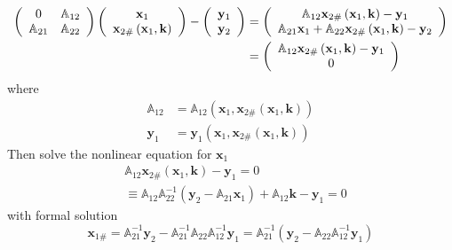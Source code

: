 \documentclass[aps,preprint]{revtex4}%
\begin{document}
\begin{align}
\left(
\begin{array}
[c]{cc}%
0 & \mathbb{A}_{12}\\
\mathbb{A}_{21} & \mathbb{A}_{22}%
\end{array}
\right)  \left(
\begin{array}
[c]{c}%
\mathbf{x}_{1}\\
\mathbf{x}_{2\#}\left(  \mathbf{x}_{1},\mathbf{k}\right)
\end{array}
\right)  -\left(
\begin{array}
[c]{c}%
\mathbf{y}_{1}\\
\mathbf{y}_{2}%
\end{array}
\right)   &  =\left(
\begin{array}
[c]{c}%
\mathbb{A}_{12}\mathbf{x}_{2\#}\left(  \mathbf{x}_{1},\mathbf{k}\right)
-\mathbf{y}_{1}\\
\mathbb{A}_{21}\mathbf{x}_{1}+\mathbb{A}_{22}\mathbf{x}_{2\#}\left(
\mathbf{x}_{1},\mathbf{k}\right)  -\mathbf{y}_{2}%
\end{array}
\right) \nonumber\\
&  =\left(
\begin{array}
[c]{c}%
\mathbb{A}_{12}\mathbf{x}_{2\#}\left(  \mathbf{x}_{1},\mathbf{k}\right)
-\mathbf{y}_{1}\\
0
\end{array}
\right)
\end{align}
where
\begin{align}
\mathbb{A}_{12}  &  =\mathbb{A}_{12}\left(  \mathbf{x}_{1},\mathbf{x}%
_{2\#}\left(  \mathbf{x}_{1},\mathbf{k}\right)  \right) \nonumber\\
\mathbf{y}_{1}  &  =\mathbf{y}_{1}\left(  \mathbf{x}_{1},\mathbf{x}%
_{2\#}\left(  \mathbf{x}_{1},\mathbf{k}\right)  \right)
\end{align}
Then solve the nonlinear equation for $\mathbf{x}_{1}$
\begin{align}
&  \mathbb{A}_{12}\mathbf{x}_{2\#}\left(  \mathbf{x}_{1},\mathbf{k}\right)
-\mathbf{y}_{1}=0\nonumber\\
&  \equiv\mathbb{A}_{12}\mathbb{A}_{22}^{-1}\left(  \mathbf{y}_{2}%
-\mathbb{A}_{21}\mathbf{x}_{1}\right)  +\mathbb{A}_{12}\mathbf{k}%
-\mathbf{y}_{1}=0 \label{X1eq}%
\end{align}
with formal solution
\[
\mathbf{x}_{1\#}=\mathbb{A}_{21}^{-1}\mathbf{y}_{2}-\mathbb{A}_{21}%
^{-1}\mathbb{A}_{22}\mathbb{A}_{12}^{-1}\mathbf{y}_{1}=\mathbb{A}_{21}%
^{-1}\left(  \mathbf{y}_{2}-\mathbb{A}_{22}\mathbb{A}_{12}^{-1}\mathbf{y}%
_{1}\right)
\]
\end{document}
